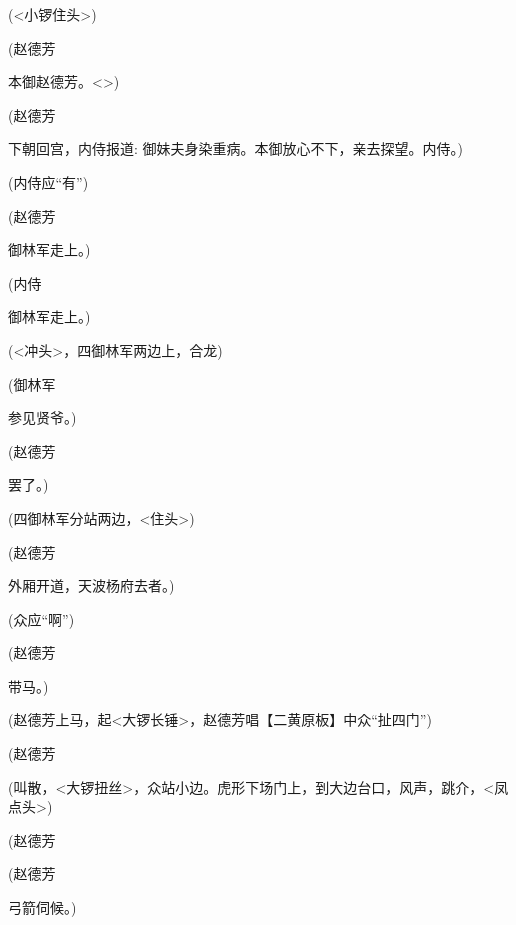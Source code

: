 ({\textless{}小锣住头\textgreater{}})

(赵德芳\hspace{20pt}~

本御赵德芳。\textless{}\!\textgreater{})

(赵德芳

下朝回宫，内侍报道: 御妹夫身染重病。本御放心不下，亲去探望。内侍。)

({\akai 内}侍应``有'')

(赵德芳\hspace{20pt}~

御林军走上。)

({\akai 内}侍\hspace{30pt}~

御林军走上。)

({\textless{}冲头\textgreater{}，}四{御林军}两边上{，}合龙)

(御林军\hspace{20pt}~

参见贤爷。)

(赵德芳\hspace{20pt}~

罢了。)

(四{御林军}分站两边{，\textless{}住头\textgreater{}})

(赵德芳\hspace{20pt}~

外厢开道，天波杨府去者。)

(众应``啊'')

(赵德芳\hspace{20pt}~

带马。)

(赵德芳上马，起{\textless{}大锣长锤\textgreater{}，赵德芳唱}【{\akai 二黄原板}】中众``扯四门'')

(赵德芳


(叫散{，\textless{}大锣扭丝\textgreater{}，众站小边。虎形下场门上，到大边台口，风声，跳介，\textless{}凤点头\textgreater{}})

(赵德芳\hspace{20pt}~


(赵德芳\hspace{20pt}~

弓箭伺候。)


